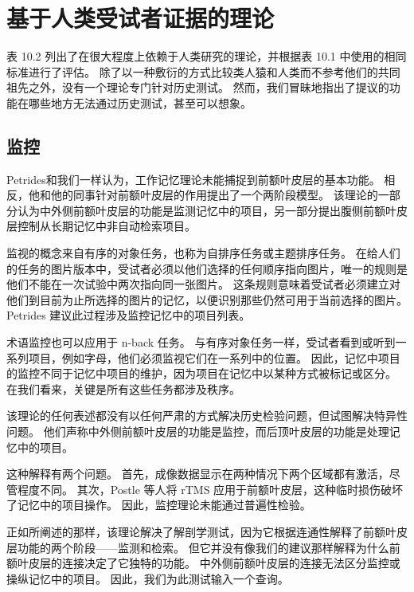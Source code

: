 \section{基于人类受试者证据的理论}

表 10.2 列出了在很大程度上依赖于人类研究的理论，并根据表 10.1 中使用的相同标准进行了评估。
除了以一种敷衍的方式比较类人猿和人类而不参考他们的共同祖先之外，没有一个理论专门针对历史测试。
然而，我们冒昧地指出了提议的功能在哪些地方无法通过历史测试，甚至可以想象。



\subsection{监控}

Petrides\cite{petrides1994frontal}和我们一样认为，工作记忆理论未能捕捉到前额叶皮层的基本功能。
相反，他和他的同事针对前额叶皮层的作用提出了一个两阶段模型\cite{owen1996evidence}。
该理论的一部分认为中外侧前额叶皮层的功能是监测记忆中的项目，另一部分提出腹侧前额叶皮层控制从长期记忆中非自动检索项目。
\par


监视的概念来自有序的对象任务，也称为自排序任务或主题排序任务。
在给人们的任务的图片版本中，受试者必须以他们选择的任何顺序指向图片，唯一的规则是他们不能在一次试验中两次指向同一张图片。
这条规则意味着受试者必须建立对他们到目前为止所选择的图片的记忆，以便识别那些仍然可用于当前选择的图片。
Petrides 建议此过程涉及监控记忆中的项目列表。
\par


术语监控也可以应用于 n-back 任务。
与有序对象任务一样，受试者看到或听到一系列项目，例如字母，他们必须监视它们在一系列中的位置。
因此，记忆中项目的监控不同于记忆中项目的维护，因为项目在记忆中以某种方式被标记或区分。
在我们看来，关键是所有这些任务都涉及秩序。
\par


该理论的任何表述都没有以任何严肃的方式解决历史检验问题，但\cite{champod2007dissociable}试图解决特异性问题。
他们声称中外侧前额叶皮层的功能是监控，而后顶叶皮层的功能是处理记忆中的项目。
\par


这种解释有两个问题。
首先，成像数据显示在两种情况下两个区域都有激活，尽管程度不同。
其次，Postle 等人\cite{postle2006repetitive}将 rTMS 应用于前额叶皮层，这种临时损伤破坏了记忆中的项目操作。
因此，监控理论未能通过普遍性检验。
\par


正如所阐述的那样，该理论解决了解剖学测试，因为它根据连通性解释了前额叶皮层功能的两个阶段——监测和检索。
但它并没有像我们的建议那样解释为什么前额叶皮层的连接决定了它独特的功能。
中外侧前额叶皮层的连接无法区分监控或操纵记忆中的项目。
因此，我们为此测试输入一个查询。



